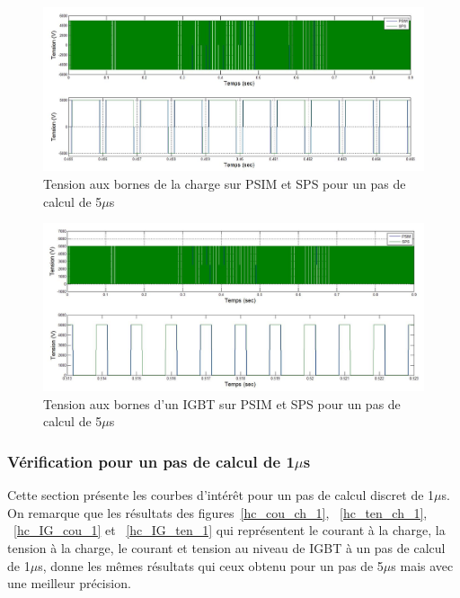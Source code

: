 \documentclass[11pt,letterpaper,final]{report}
\begin{document}
\begin{figure}[htb]
\centering
\includegraphics[scale=0.5]{Fig/Hacheur4Quadrants/HacheurTensionCharge5u.jpg}
\caption{Tension aux bornes de la charge sur PSIM et SPS pour un pas de calcul de 5$\mu$s}
\label{hc_ten_ch_5}
\end{figure}


\begin{figure}[htb]
\centering
\includegraphics[scale=0.5]{Fig/Hacheur4Quadrants/HacheurTensionIGBT5u.jpg}
\caption{Tension aux bornes d'un IGBT sur PSIM et SPS pour un pas de calcul de 5$\mu$s}
\label{hc_IG_ten_5}
\end{figure}

\clearpage
\subsubsection{Vérification pour un pas de calcul de 1$\mu$s}
Cette section présente les courbes d'intérêt pour un pas de calcul discret de 1$\mu$s. On remarque que les résultats des figures~\ref{hc_cou_ch_1}, ~\ref{hc_ten_ch_1}, ~\ref{hc_IG_cou_1} et ~\ref{hc_IG_ten_1} qui représentent le courant à la charge, la tension à la charge, le courant et tension au niveau de IGBT à un pas de calcul de 1$\mu$s, donne les mêmes résultats qui ceux obtenu pour un pas de 5$\mu$s mais avec une meilleur précision. 
\end{document}
